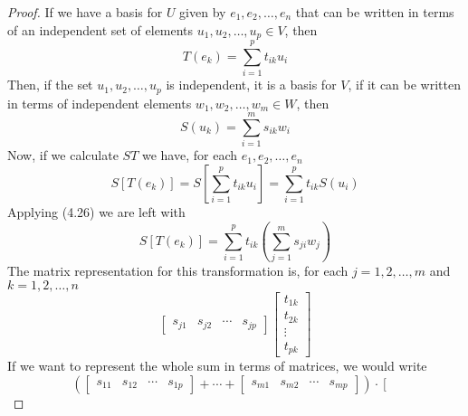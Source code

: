 \documentclass[../linear-spaces.tex]{subfiles}
\begin{document}
\begin{proof}
    If we have a basis for $U$ given by $e_1,e_2,\dots,e_n$ that can be written in terms
    of an independent set of elements $u_1,u_2,\dots,u_p\in V$, then
    \begin{equation}
        T(e_k) = \sum_{i=1}^{p}{t_{ik} u_i}
    \end{equation}
    Then, if the set $u_1,u_2,\dots,u_p$ is independent, it is a basis for $V$, if it can be written in terms of
    independent elements $w_1,w_2,\dots,w_m\in W$, then
    \begin{equation}
        S(u_k) = \sum_{i=1}^{m}{s_{ik} w_i}
    \end{equation}
    Now, if we calculate $ST$ we have, for each $e_1,e_2,\dots,e_n$
    \begin{equation}
        S\left[T\left(e_k\right)\right] = S\left[\sum_{i=1}^{p}{t_{ik} u_i}\right] = \sum_{i=1}^{p}{t_{ik} S(u_i)}
    \end{equation}
    Applying (4.26) we are left with
    \begin{equation}
        S\left[T\left(e_k\right)\right]=\sum_{i=1}^{p}{t_{ik} \left(\sum_{j=1}^{m}{s_{ji}w_j}\right)}
    \end{equation}
    The matrix representation for this transformation is, for each $j=1,2,\dots,m$ and $k=1,2,\dots,n$
    \begin{equation*}
        \left[\begin{matrix}
                s_{j1} & s_{j2} & \cdots & s_{jp}
            \end{matrix}\right]
        \left[\begin{matrix}
                t_{1k} \\t_{2k}\\\vdots\\t_{pk}
            \end{matrix}\right]
    \end{equation*}
    If we want to represent the whole sum in terms of matrices, we would write
    \begin{equation}
        \left(
        \left[\begin{matrix}
                s_{11} & s_{12} & \cdots & s_{1p}
            \end{matrix}\right]
        + \cdots +
        \left[\begin{matrix}
                s_{m1} & s_{m2} & \cdots & s_{mp}
            \end{matrix}\right]
        \right)\cdot  \left[\begin{matrix}

\end{matrix}
\end{equation}
\end{proof}
\end{document}
